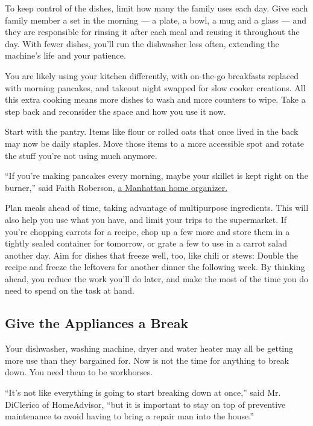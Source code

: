 To keep control of the dishes, limit how many the family uses each day.
Give each family member a set in the morning --- a plate, a bowl, a mug
and a glass --- and they are responsible for rinsing it after each meal
and reusing it throughout the day. With fewer dishes, you'll run the
dishwasher less often, extending the machine's life and your patience.

You are likely using your kitchen differently, with on-the-go breakfasts
replaced with morning pancakes, and takeout night swapped for slow
cooker creations. All this extra cooking means more dishes to wash and
more counters to wipe. Take a step back and reconsider the space and how
you use it now.

Start with the pantry. Items like flour or rolled oats that once lived
in the back may now be daily staples. Move those items to a more
accessible spot and rotate the stuff you're not using much anymore.

``If you're making pancakes every morning, maybe your skillet is kept
right on the burner,'' said Faith Roberson,
\href{https://www.organizewithfaith.com/about}{a Manhattan home
organizer.}

Plan meals ahead of time, taking advantage of multipurpose ingredients.
This will also help you use what you have, and limit your trips to the
supermarket. If you're chopping carrots for a recipe, chop up a few more
and store them in a tightly sealed container for tomorrow, or grate a
few to use in a carrot salad another day. Aim for dishes that freeze
well, too, like chili or stews: Double the recipe and freeze the
leftovers for another dinner the following week. By thinking ahead, you
reduce the work you'll do later, and make the most of the time you do
need to spend on the task at hand.

\hypertarget{give-the-appliances-a-break}{%
\subsection{Give the Appliances a
Break}\label{give-the-appliances-a-break}}

Your dishwasher, washing machine, dryer and water heater may all be
getting more use than they bargained for. Now is not the time for
anything to break down. You need them to be workhorses.

``It's not like everything is going to start breaking down at once,''
said Mr. DiClerico of HomeAdvisor, ``but it is important to stay on top
of preventive maintenance to avoid having to bring a repair man into the
house.''

